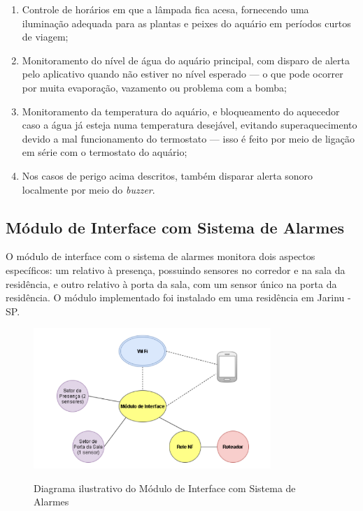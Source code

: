 \begin{enumerate}
	\item Controle de horários em que a lâmpada fica acesa, fornecendo uma iluminação adequada para as plantas e peixes do aquário em períodos curtos de viagem;
	\item Monitoramento do nível de água do aquário principal, com disparo de alerta pelo aplicativo quando não estiver no nível esperado --- o que pode ocorrer por muita evaporação, vazamento ou problema com a bomba;
	\item Monitoramento da temperatura do aquário, e bloqueamento do aquecedor caso a água já esteja numa temperatura desejável, evitando superaquecimento devido a mal funcionamento do termostato --- isso é feito por meio de ligação em série com o termostato do aquário;
	\item Nos casos de perigo acima descritos, também disparar alerta sonoro localmente por meio do \emph{buzzer}.

\end{enumerate}

\subsection{Módulo de Interface com Sistema de Alarmes}

O módulo de interface com o sistema de alarmes monitora dois aspectos específicos: um relativo à presença, possuindo sensores no corredor e na sala da residência, e outro relativo à porta da sala, com um sensor único na porta da residência. O módulo implementado foi instalado em uma residência em Jarinu - SP.

\begin{figure}[H]
	\centering
	\caption{Diagrama ilustrativo do Módulo de Interface com Sistema de Alarmes}
	\includegraphics[width=0.8\textwidth]{diagramaAlarme}
	\label{fig:diagramaAlarme}
\end{figure}

